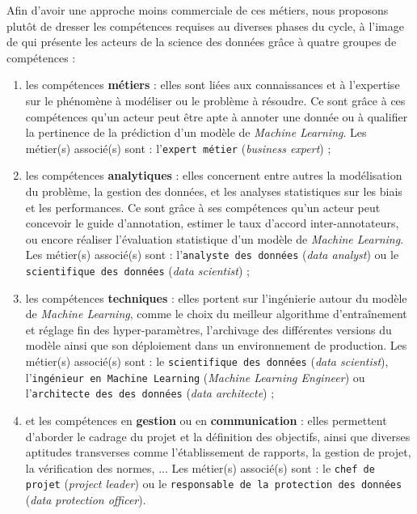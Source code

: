 		Afin d'avoir une approche moins commerciale de ces métiers, nous proposons plutôt de dresser les compétences requises au diverses phases du cycle, à l'image de \cite{radovilsky-etal:2018:skills-requirements-business} qui présente les acteurs de la science des données grâce à quatre groupes de compétences :
		\begin{enumerate}
			\item les compétences \textbf{métiers} : elles sont liées aux connaissances et à l'expertise sur le phénomène à modéliser ou le problème à résoudre.
			Ce sont grâce à ces compétences qu'un acteur peut être apte à annoter une donnée ou à qualifier la pertinence de la prédiction d'un modèle de \textit{Machine Learning}.
			Les métier(s) associé(s) sont : l'\texttt{expert métier} (\textit{business expert}) ;
			\item les compétences \textbf{analytiques} : elles concernent entre autres la modélisation du problème, la gestion des données, et les analyses statistiques sur les biais et les performances.
			Ce sont grâce à ses compétences qu'un acteur peut concevoir le guide d'annotation, estimer le taux d'accord inter-annotateurs, ou encore réaliser l'évaluation statistique d'un modèle de \textit{Machine Learning}.
			Les métier(s) associé(s) sont : l'\texttt{analyste des données} (\textit{data analyst}) ou le \texttt{scientifique des données} (\textit{data scientist}) ;
			\item les compétences \textbf{techniques} : elles portent sur l'ingénierie autour du modèle de \textit{Machine Learning}, comme le choix du meilleur algorithme d'entraînement et réglage fin des hyper-paramètres, l'archivage des différentes versions du modèle ainsi que son déploiement dans un environnement de production.
			Les métier(s) associé(s) sont : le \texttt{scientifique des données} (\textit{data scientist}), l'\texttt{ingénieur en Machine Learning} (\textit{Machine Learning Engineer}) ou l'\texttt{architecte des des données} (\textit{data architecte}) ;
			\item et les compétences en \textbf{gestion} ou en \textbf{communication} : elles permettent d'aborder le cadrage du projet et la définition des objectifs, ainsi que diverses aptitudes transverses comme l'établissement de rapports, la gestion de projet, la vérification des normes, ...
			Les métier(s) associé(s) sont : le \texttt{chef de projet} (\textit{project leader}) ou le \texttt{responsable de la protection des données} (\textit{data protection officer}).
		\end{enumerate}
